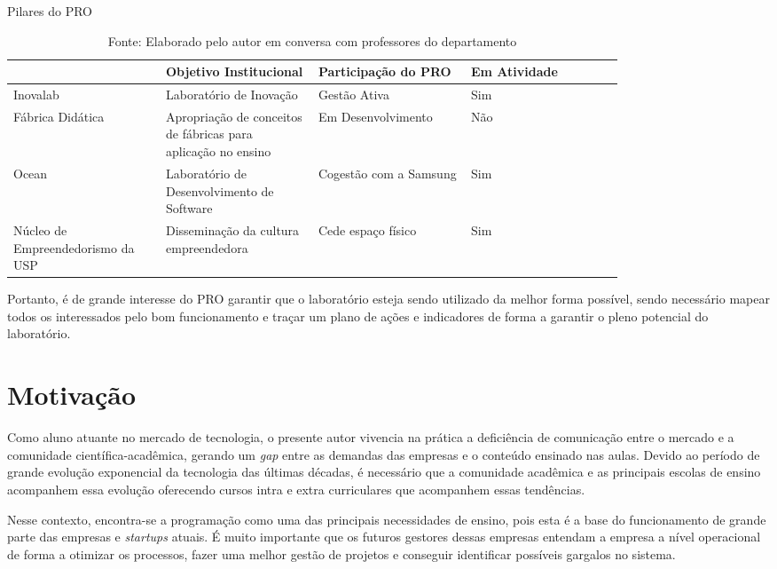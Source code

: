 \begin{table}[h]
\begin{center}
\caption{Pilares do PRO}
\label{tab:pilares_pro}
{\def\arraystretch{2}\tabcolsep=10pt
\begin{tabular}{>{\raggedright}p{0.2\linewidth}>{\raggedright\arraybackslash}p{0.2\linewidth}>{\raggedright\arraybackslash}p{0.2\linewidth}>{\raggedright\arraybackslash}p{0.2\linewidth}}
\hline
     & Objetivo Institucional & Participação do PRO & Em Atividade  \\ \hline
     Inovalab & Laboratório de Inovação & Gestão Ativa & Sim  \\
     Fábrica Didática & Apropriação de conceitos de fábricas para aplicação no ensino & Em Desenvolvimento & Não \\
     Ocean & Laboratório de Desenvolvimento de Software & Cogestão com a Samsung & Sim \\
	 Núcleo de Empreendedorismo da USP & Disseminação da cultura empreendedora & Cede espaço físico & Sim \\ \hline
\end{tabular}%
}
\caption* {Fonte: Elaborado pelo autor em conversa com professores do departamento}
\end{center}
\end{table}

Portanto, é de grande interesse do PRO garantir que o laboratório esteja sendo utilizado da melhor forma possível, sendo necessário mapear todos os interessados pelo bom funcionamento e traçar um plano de ações e indicadores de forma a garantir o pleno potencial do laboratório.

\section{Motivação} %
\label{cha:motivacao}

Como aluno atuante no mercado de tecnologia, o presente autor vivencia na prática a deficiência de comunicação entre o mercado e a comunidade científica-acadêmica, gerando um \textit{gap} entre as demandas das empresas e o conteúdo ensinado nas aulas. Devido ao período de grande evolução exponencial da tecnologia das últimas décadas, é necessário que a comunidade acadêmica e as principais escolas de ensino acompanhem essa evolução oferecendo cursos intra e extra curriculares que acompanhem essas tendências.

Nesse contexto, encontra-se a programação como uma das principais necessidades de ensino, pois esta é a base do funcionamento de grande parte das empresas e \textit{startups} atuais. É muito importante que os futuros gestores dessas empresas entendam a empresa a nível operacional de forma a otimizar os processos, fazer uma melhor gestão de projetos e conseguir identificar possíveis gargalos no sistema.

